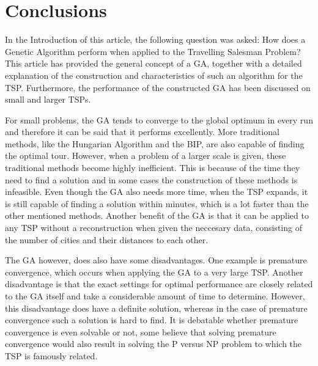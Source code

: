 \section{Conclusions}
\par
In the Introduction of this article, the following question was asked: How does a Genetic Algorithm perform when applied to the Travelling Salesman Problem?
This article has provided the general concept of a GA, together with a detailed explanation of the construction and characteristics of such an algorithm for the TSP. Furthermore, the performance of the constructed GA has been discussed on small and larger TSPs. 

\par
For small problems, the GA tends to converge to the global optimum in every run and therefore it can be said that it performs excellently. More traditional methods, like the Hungarian Algorithm and the BIP, are also capable of finding the optimal tour. However, when a problem of a larger scale is given, these traditional methods become highly inefficient. This is because of the time they need to find a solution and in some cases the construction of these methods is infeasible. Even though the GA also needs more time, when the TSP expands, it is still capable of finding a solution within minutes, which is a lot faster than the other mentioned methods. Another benefit of the GA is that it can be applied to any TSP without a reconstruction when given the neccesary data, consisting of the number of cities and their distances to each other. 

\par
The GA however, does also have some disadvantages. One example is premature convergence, which occurs when applying the GA to a very large TSP. Another disadvantage is that the exact settings for optimal performance are closely related to the GA itself and take a considerable amount of time to determine. However, this disadvantage does have a definite solution, whereas in the case of premature convergence such a solution is hard to find. It is debatable whether premature convergence is even solvable or not, some believe that solving premature convergence would also result in solving the P versus NP problem to which the TSP is famously related. 

